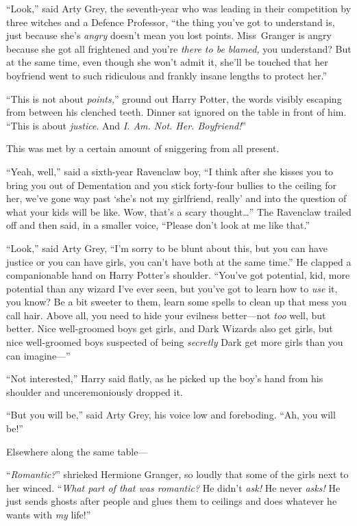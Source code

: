 “Look,” said Arty Grey, the seventh-year who was leading in their competition by three witches and a Defence Professor, “the thing you’ve got to understand is, just because she’s \emph{angry} doesn’t mean you lost points. Miss~Granger is angry because she got all frightened and you’re \emph{there to be blamed,} you understand? But at the same time, even though she won’t admit it, she’ll be touched that her boyfriend went to such ridiculous and frankly insane lengths to protect her.”

“This is not about \emph{points,}” ground out Harry Potter, the words visibly escaping from between his clenched teeth. Dinner sat ignored on the table in front of him. “This is about \emph{justice}. And \emph{I\@. Am. Not. Her. Boyfriend!}”

This was met by a certain amount of sniggering from all present.

“Yeah, well,” said a sixth-year Ravenclaw boy, “I think after she kisses you to bring you out of Dementation and you stick forty-four bullies to the ceiling for her, we’ve gone way past ‘she’s not my girlfriend, really’ and into the question of what your kids will be like. Wow, that’s a scary thought…” The Ravenclaw trailed off and then said, in a smaller voice, “Please don’t look at me like that.”

“Look,” said Arty Grey, “I’m sorry to be blunt about this, but you can have justice or you can have girls, you can’t have both at the same time.” He clapped a companionable hand on Harry Potter’s shoulder. “You’ve got potential, kid, more potential than any wizard I’ve ever seen, but you’ve got to learn how to \emph{use} it, you know? Be a bit sweeter to them, learn some spells to clean up that mess you call hair. Above all, you need to hide your evilness better—not \emph{too} well, but better. Nice well-groomed boys get girls, and Dark Wizards also get girls, but nice well-groomed boys suspected of being \emph{secretly} Dark get more girls than you can imagine—”

“Not interested,” Harry said flatly, as he picked up the boy’s hand from his shoulder and unceremoniously dropped it.

“But you will be,” said Arty Grey, his voice low and foreboding. “Ah, you will be!”

Elsewhere along the same table—

“\emph{Romantic?}” shrieked Hermione Granger, so loudly that some of the girls next to her winced. “\emph{What part of that was romantic?} He didn’t \emph{ask!} He never \emph{asks!} He just sends ghosts after people and glues them to ceilings and does whatever he wants with \emph{my} life!”

